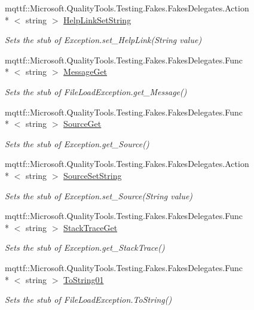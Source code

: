\begin{DoxyCompactItemize}
mqttf\-::\-Microsoft.\-Quality\-Tools.\-Testing.\-Fakes.\-Fakes\-Delegates.\-Action\\*
$<$ string $>$ \hyperlink{class_system_1_1_i_o_1_1_fakes_1_1_stub_file_load_exception_aaeebda11d2c43c959dc5f5b39a0cc4c2}{Help\-Link\-Set\-String}
\begin{DoxyCompactList}\small\item\em Sets the stub of Exception.\-set\-\_\-\-Help\-Link(\-String value)\end{DoxyCompactList}\item 
mqttf\-::\-Microsoft.\-Quality\-Tools.\-Testing.\-Fakes.\-Fakes\-Delegates.\-Func\\*
$<$ string $>$ \hyperlink{class_system_1_1_i_o_1_1_fakes_1_1_stub_file_load_exception_a8dbd3edd7f083134ad40323579b0b7cd}{Message\-Get}
\begin{DoxyCompactList}\small\item\em Sets the stub of File\-Load\-Exception.\-get\-\_\-\-Message()\end{DoxyCompactList}\item 
mqttf\-::\-Microsoft.\-Quality\-Tools.\-Testing.\-Fakes.\-Fakes\-Delegates.\-Func\\*
$<$ string $>$ \hyperlink{class_system_1_1_i_o_1_1_fakes_1_1_stub_file_load_exception_acb01de7cf171165ee749296d5a7ab702}{Source\-Get}
\begin{DoxyCompactList}\small\item\em Sets the stub of Exception.\-get\-\_\-\-Source()\end{DoxyCompactList}\item 
mqttf\-::\-Microsoft.\-Quality\-Tools.\-Testing.\-Fakes.\-Fakes\-Delegates.\-Action\\*
$<$ string $>$ \hyperlink{class_system_1_1_i_o_1_1_fakes_1_1_stub_file_load_exception_ad6967ec9c6ad8ce17e86c27a261db475}{Source\-Set\-String}
\begin{DoxyCompactList}\small\item\em Sets the stub of Exception.\-set\-\_\-\-Source(\-String value)\end{DoxyCompactList}\item 
mqttf\-::\-Microsoft.\-Quality\-Tools.\-Testing.\-Fakes.\-Fakes\-Delegates.\-Func\\*
$<$ string $>$ \hyperlink{class_system_1_1_i_o_1_1_fakes_1_1_stub_file_load_exception_a04d565310670b6beefe3f981f8cf2f29}{Stack\-Trace\-Get}
\begin{DoxyCompactList}\small\item\em Sets the stub of Exception.\-get\-\_\-\-Stack\-Trace()\end{DoxyCompactList}\item 
mqttf\-::\-Microsoft.\-Quality\-Tools.\-Testing.\-Fakes.\-Fakes\-Delegates.\-Func\\*
$<$ string $>$ \hyperlink{class_system_1_1_i_o_1_1_fakes_1_1_stub_file_load_exception_a8c20de968a71c3619e49db6dac4d69d1}{To\-String01}
\begin{DoxyCompactList}\small\item\em Sets the stub of File\-Load\-Exception.\-To\-String()\end{DoxyCompactList}\end{DoxyCompactItemize}

